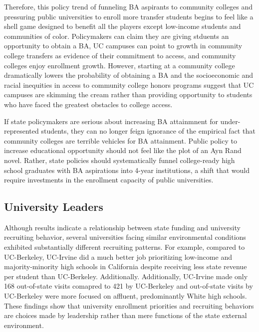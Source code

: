 \documentclass[twoside]{article}
\begin{document}
Therefore, this policy trend of funneling BA aspirants to community colleges and pressuring public universities to enroll more transfer students begins to feel like a shell game designed to benefit all the players except low-income students and communities of color. Policymakers can claim they are giving stduents an opportunity to obtain a BA, UC campuses can point to growth in community college transfers as evidence of their commitment to access, and community colleges enjoy enrollment growth. However, starting at a community college dramatically lowers the probability of obtaining a BA and the socioeconomic and racial inequities in access to community college honors programs suggest that UC campuses are skimming the cream rather than providing opportunity to students who have faced the greatest obstacles to college access.

If state policymakers are serious about increasing BA attainmnent for under-represented students, they can no longer feign ignorance of the empirical fact that community colleges are terrible vehicles for BA attainment. Public policy to increase educational opportunity should not feel like the plot of an Ayn Rand novel. Rather, state policies should systematically funnel college-ready high school graduates with BA aspirations into 4-year institutions, a shift that would require investments in the enrollment capacity of public universities.

\subsection*{University Leaders}

Although results indicate a relationship between state funding and university recruiting behavior, several universities facing similar environmental conditions exhibited substantially different recruiting patterns. For example, compared to UC-Berkeley, UC-Irvine did a much better job prioritizing low-income and majority-minority high schools in California despite receiving less state revenue per student than UC-Berkeley. Additionally.  Additionally, UC-Irvine made only 168 out-of-state visits comapred to 421 by UC-Berkeley and out-of-state visits by UC-Berkeley were more focused on affluent, predominantly White high schools.  These findings show that university enrollment priorities and recruiting behaviors are choices made by leadership rather than mere functions of the state external environment.
\end{document}
